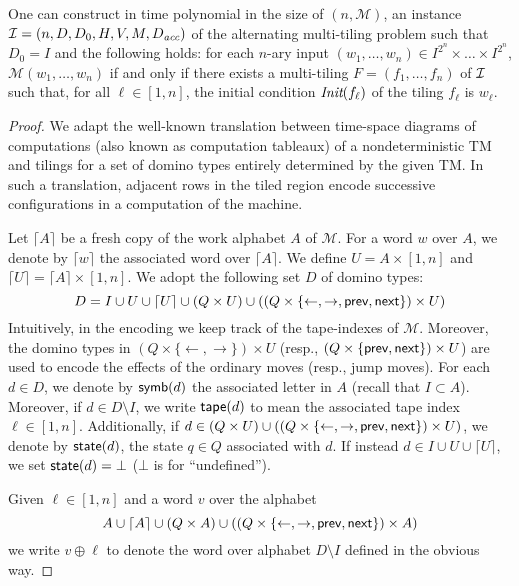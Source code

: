 \begin{proposition} 
One can construct in time polynomial in the size of $(n,\mathcal{M})$, an instance
$\mathcal{I}= (n,D,D_0,\allowbreak H,V, M,D_{\textit{acc}})$ of the alternating multi-tiling problem such that $D_0=I$ and the following holds:
 for each $n$-ary input $(w_1,\ldots,w_n)\in I^{2^{n}}\times \ldots \times I^{2^{n}}$, $\mathcal{M}(w_1,\ldots,w_n)$ if and only if there exists a multi-tiling $F=(f_1,\ldots,f_n)$
 of $\mathcal{I}$ such that, for all $\ell\in [1,n]$, the initial condition $\textit{Init}(f_\ell)$ of the tiling $f_\ell$ is $w_\ell$.
\end{proposition}
\begin{proof} 
We adapt the well-known translation between time-space diagrams of computations (also known as computation tableaux) of a nondeterministic TM and tilings for a set of domino types entirely determined by the given TM. In such a translation, adjacent  rows in the tiled region encode successive configurations in a  computation of the  machine.

Let $\lceil A \rceil$  be a fresh copy of the work alphabet $A$ of $\mathcal{M}$.   For a word $w$ over $A$, we denote by $\lceil w \rceil $   the associated word over $\lceil A \rceil$. We define $U = A \times [1,n]$ and $\lceil U \rceil  = \lceil A \rceil \times [1,n]$.
We adopt the following set $D$ of domino types:
%
\[
D = I \cup U \cup \lceil U\rceil \cup   (Q \times U) \cup ((Q\times \{ \leftarrow,\rightarrow,\text{{\sffamily prev}},\text{{\sffamily next}}\})\times U) 
\]
%
Intuitively, in the encoding we keep track of the tape-indexes of $\mathcal{M}$. Moreover, the domino types in $(Q\times \{ \leftarrow,\rightarrow\})\times U$ (resp., $(Q\times \{\text{{\sffamily prev}},\text{{\sffamily next}}\})\times U$) are used to encode the effects of the ordinary moves (resp., jump moves). For each $d\in D$, we denote by $\text{{\sffamily symb}}(d)$ the associated letter in $A$ (recall that $I\subset A$).
Moreover, if $d \in D\setminus I$, we write $\text{{\sffamily tape}}(d)$ to mean the associated tape index $\ell\in [1,n]$.
Additionally, if $d\in (Q \times U) \cup ((Q\times \{ \leftarrow,\rightarrow,\text{{\sffamily prev}},\text{{\sffamily next}}\})\times U)$, we denote by $\text{{\sffamily state}}(d)$, the state $q\in Q$ associated with $d$. If instead $d\in I\cup U \cup \lceil U\rceil $, we set $\text{{\sffamily state}}(d) =\bot$ ($\bot$ is for ``undefined'').

Given $\ell\in [1,n]$ and a word $v$ over the alphabet
%
\[
A\cup \lceil A\rceil \cup   (Q \times A) \cup ((Q\times \{ \leftarrow,\rightarrow,\text{{\sffamily prev}},\text{{\sffamily next}}\})\times A)
\]
% 
we write $v\oplus \ell$ to denote the word over alphabet $D\setminus I$ defined in the obvious way.
 

\end{proof}
